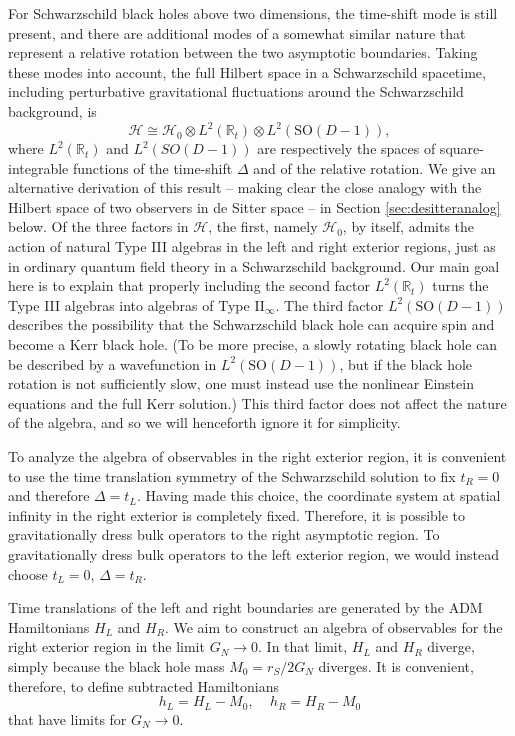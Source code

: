 \documentclass[11pt,a4paper]{article}
\def\be{\begin{equation}}
\def\ee{\end{equation}}
\def\R{{\mathbb R}}
\def\H{{\mathcal H}}
\def\SO{{\mathrm{SO}}}
\begin{document}
For Schwarzschild black holes above two dimensions, the  time-shift mode is still present, and there are additional modes of a somewhat similar
nature that represent a relative rotation between the two asymptotic boundaries.   
  Taking these modes into account, the full  Hilbert space in a Schwarzschild spacetime, 
including perturbative gravitational fluctuations  around the Schwarzschild
background,  is
\be \label{eq:Hphys}
\mathcal{H} \cong \mathcal{H}_0 \otimes L^2(\R_t) \otimes L^2(\SO(D-1)),
\ee
where $L^2(\R_t)$ and $L^2(SO(D-1))$ are respectively the spaces of square-integrable functions of the  time-shift $\Delta$ and of the relative rotation.   
We give an alternative derivation of this result -- making clear the close analogy with the Hilbert space 
of two observers in de Sitter space -- in Section \ref{sec:desitteranalog} below.     Of the three factors in $\H$, the first, namely $\H_0$, by itself, admits the action of
natural Type III algebras in the left and right exterior regions, just as in ordinary quantum field theory in a Schwarzschild background.   Our main goal here is to explain that properly including the
second factor $L^2(\R_t)$ turns the Type III algebras into algebras of Type II$_\infty$.    The third factor
$L^2(\SO(D-1))$ describes the possibility that the Schwarzschild black hole can acquire spin and become a  Kerr black hole.     (To be more precise, a
 slowly rotating black hole
can be described by a wavefunction in $L^2(\SO(D-1))$, but if the black hole rotation is not sufficiently slow, one must instead use the nonlinear Einstein
equations and the full Kerr solution.)        This third factor does not affect the
nature of the algebra, and so we will henceforth ignore it for simplicity.  


To analyze the algebra of observables in the right exterior region, it is convenient to use the time translation symmetry of the Schwarzschild solution
to fix $t_R=0$ and therefore $\Delta= t_L$.   Having made this choice, the coordinate system at spatial infinity in the right exterior is completely fixed.   Therefore, it is possible to gravitationally dress bulk operators
to the right asymptotic region.   To gravitationally dress bulk operators to the left exterior region,   we would instead choose
$ t_L=0$, $\Delta = t_R$.

Time translations of the left and right boundaries are generated by the ADM Hamiltonians $H_L$ and $H_R$.   We aim to construct an algebra of
observables for the right exterior region in the limit $G_N\to 0$.   In that limit, $H_L$ and $H_R$ diverge, simply because the black hole mass $M_0=r_S/2G_N$ 
diverges.   It is convenient, therefore, to define subtracted Hamiltonians
\be\label{redham} h_L=H_L-M_0,~~~~~h_R=H_R-M_0 \ee
that have limits for $G_N\to 0$.    
\end{document}
